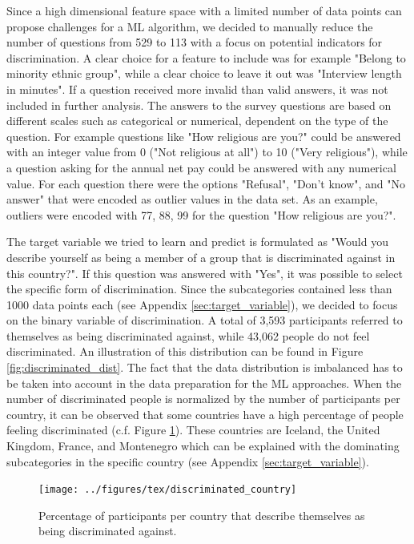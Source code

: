 \documentclass[10pt]{article}
\begin{document}
	Since a high dimensional feature space with a limited number of data points can propose challenges for a ML algorithm, we decided to manually reduce the number of questions from 529 to 113 with a focus on potential indicators for discrimination. A clear choice for a feature to include was for example "Belong to minority ethnic group", while a clear choice to leave it out was "Interview length in minutes". If a question received more invalid than valid answers, it was not included in further analysis.
	The answers to the survey questions are based on different scales such as categorical or numerical, dependent on the type of the question. For example questions like "How religious are you?" could be answered with an integer value from 0 ("Not religious at all") to 10 ("Very religious"), while a question asking for the annual net pay could be answered with any numerical value. For each question there were the options "Refusal", "Don't know", and "No answer" that were encoded as outlier values in the data set. As an example, outliers were encoded with 77, 88, 99 for the question "How religious are you?".
	
	The target variable we tried to learn and predict is formulated as "Would you describe yourself as being a member of a group that is discriminated against in this country?". 
	If this question was answered with "Yes", it was possible to select the specific form of discrimination. Since the subcategories contained less than 1000 data points each (see Appendix \ref{sec:target_variable}), we decided to focus on the binary variable of discrimination. A total of 3,593 participants referred to themselves as being discriminated against, while 43,062 people do not feel discriminated. An illustration of this distribution can be found in Figure \ref{fig:discriminated_dist}. The fact that the data distribution is imbalanced has to be taken into account in the data preparation for the ML approaches. 
	When the number of discriminated people is normalized by the number of participants per country, it can be observed that some countries have a high percentage of people feeling discriminated (c.f. Figure \ref{fig:discriminated_country}). These countries are Iceland, the United Kingdom, France, and Montenegro which can be explained with the dominating subcategories in the specific country (see Appendix \ref{sec:target_variable}). 
	\begin{figure}[h]
		\centering
		\texttt{[image: ../figures/tex/discriminated\_country]}
		\caption{Percentage of participants per country that describe themselves as being discriminated against.}
		\label{fig:discriminated_country} %
	\end{figure}
	
\end{document}
